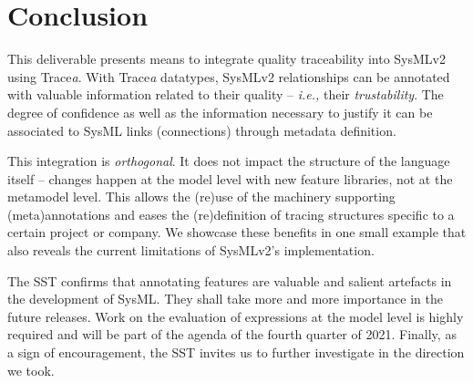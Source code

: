 \section{Conclusion}\label{sec:conclusion}
This deliverable presents means to integrate quality traceability into SysMLv2 using Trace\textit{a}.
With Trace\textit{a} datatypes, SysMLv2 relationships can be annotated with valuable information related to their quality -- \textit{i.e.,} their \textit{trustability}. 
The degree of confidence as well as the information necessary to justify it can be associated to SysML links (connections) through metadata definition.


This integration is \textit{orthogonal}. It does not impact the structure of the language itself -- changes happen at the model level with new feature libraries, not at the metamodel level.
This allows the (re)use of the machinery supporting (meta)annotations and eases the (re)definition of tracing structures specific to a certain project or company. We showcase these benefits in one small example that also reveals the current limitations of SysMLv2's implementation.

The SST confirms that annotating features are valuable and salient artefacts in the development of SysML. They shall take more and more importance in the future releases. Work on the evaluation of expressions at the model level is highly required and will be part of the agenda of the fourth quarter of 2021. 
Finally, as a sign of encouragement, the SST invites us to further investigate in the direction we took. 
